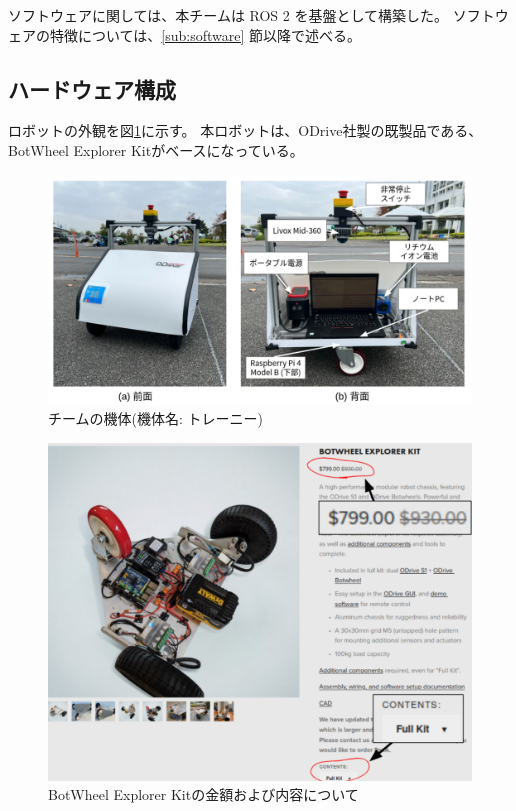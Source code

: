 \documentclass[twocolumn,9pt]{jsproceedings}
\begin{document}
ソフトウェアに関しては、本チームは ROS 2 \cite{ROS 2} を基盤として構築した。
ソフトウェアの特徴については、\ref{sub:software} 節以降で述べる。


\subsection{ハードウェア構成}\label{sub:hardware}
ロボットの外観を図\ref{fig:trainee}に示す。
本ロボットは、ODrive社製の既製品である、BotWheel Explorer Kit\cite{RTshop}がベースになっている。

\begin{figure}[h]
  \begin{center}
    \includegraphics[width=1.0\linewidth]{figs/trainee.pdf}
    \caption{チームの機体(機体名: トレーニー)}
    \label{fig:trainee}
  \end{center}
\end{figure}

\begin{figure}[h]
  \begin{center}
    \includegraphics[width=0.8\linewidth]{figs/b_kit_price.pdf}
    \caption{BotWheel Explorer Kitの金額および内容について}
    \label{fig:b_robot_price}
  \end{center}
\end{figure}
\end{document}
